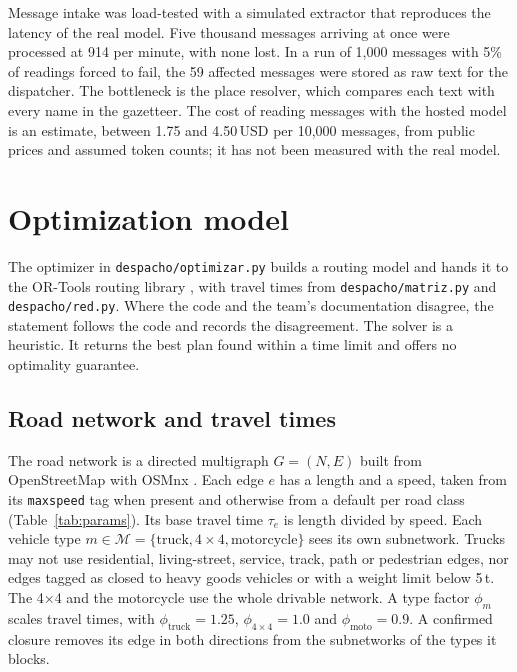 \documentclass[11pt]{article}
\newcommand{\code}[1]{\texttt{\small #1}}
\begin{document}
Message intake was load-tested with a simulated extractor that reproduces the latency of the real model. Five thousand messages arriving at once were processed at 914 per minute, with none lost. In a run of 1,000 messages with 5\% of readings forced to fail, the 59 affected messages were stored as raw text for the dispatcher. The bottleneck is the place resolver, which compares each text with every name in the gazetteer. The cost of reading messages with the hosted model is an estimate, between 1.75 and 4.50\,USD per 10,000 messages, from public prices and assumed token counts; it has not been measured with the real model.

\section{Optimization model}\label{sec:model}

The optimizer in \code{despacho/optimizar.py} builds a routing model and hands it to the OR-Tools routing library \citep{ortools_routing}, with travel times from \code{despacho/matriz.py} and \code{despacho/red.py}. Where the code and the team's documentation disagree, the statement follows the code and records the disagreement. The solver is a heuristic. It returns the best plan found within a time limit and offers no optimality guarantee.

\subsection{Road network and travel times}

The road network is a directed multigraph $G=(N,E)$ built from OpenStreetMap with OSMnx \citep{boeing2017osmnx}. Each edge $e$ has a length and a speed, taken from its \code{maxspeed} tag when present and otherwise from a default per road class (Table~\ref{tab:params}). Its base travel time $\tau_e$ is length divided by speed. Each vehicle type $m\in\mathcal{M}=\{\text{truck},\text{4}{\times}\text{4},\text{motorcycle}\}$ sees its own subnetwork. Trucks may not use residential, living-street, service, track, path or pedestrian edges, nor edges tagged as closed to heavy goods vehicles or with a weight limit below 5\,t. The 4$\times$4 and the motorcycle use the whole drivable network. A type factor $\phi_m$ scales travel times, with $\phi_{\text{truck}}=1.25$, $\phi_{4\times4}=1.0$ and $\phi_{\text{moto}}=0.9$. A confirmed closure removes its edge in both directions from the subnetworks of the types it blocks.
\end{document}
